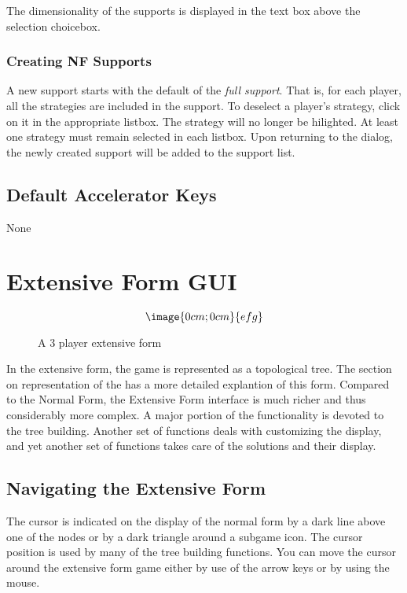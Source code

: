 The dimensionality of the supports is displayed in the text box above the selection
choicebox.

\subsubsection{Creating NF Supports}\label{NewSupport}
A new support starts with the default of the {\em full support}.  That is, for each player,
all the strategies are included in the support.  To deselect a player's strategy, click on it
in the appropriate listbox.  The strategy will no longer be hilighted.  At least one strategy
must remain selected in each listbox.  Upon returning to the 
 dialog, the newly created support will be added
to the support list.



\subsection{Default Accelerator Keys}\label{NormFormDefAccl}
None


\section{Extensive Form GUI}

\begin{figure}
$$\image{0cm;0cm}{efg}$$
\caption{A 3 player extensive form}\label{fig_efg}
\end{figure}

In the extensive form, the game is represented as a topological tree.  The 
section on representation of the  
has a more detailed explantion of this form.
Compared to the Normal Form, the Extensive Form interface is much richer
and thus considerably more complex.  A major portion of the functionality
is devoted to the tree building.  Another set of functions deals with
customizing the display, and yet another set of functions takes care of
the solutions and their display.  

\subsection{Navigating the Extensive Form}
The cursor is indicated on the display of the normal form by a dark line above 
one of the nodes or by a dark triangle around a subgame icon. 
The cursor position is used by many of the tree building functions.  
You can move the cursor around the extensive form game 
either by use of the arrow keys or by using the mouse.  

